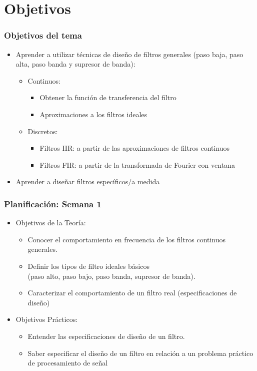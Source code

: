 \section{Objetivos}
  \begin{frame}
    \frametitle{Objetivos del tema}
      \begin{itemize}
        \item Aprender a utilizar técnicas de diseño de filtros generales (paso baja, paso alta, paso banda y supresor de banda):

        \begin{itemize}
        \normalsize
        \item Continuos: 
        \begin{itemize}
          \small
          \item Obtener la función de transferencia del filtro
          \item Aproximaciones a los filtros ideales
        \end{itemize}

        \item Discretos:
        \begin{itemize}
          \small
          \item Filtros IIR: a partir de las aproximaciones de filtros continuos
          \item Filtros FIR: a partir de la transformada de Fourier con ventana
        \end{itemize}
      \end{itemize}

      \item Aprender a diseñar filtros específicos/a medida

  \end{itemize}
\end{frame}

\begin{frame}
  \frametitle{Planificación: Semana 1}

  \begin{itemize}
    \item Objetivos de la Teoría:
    \begin{itemize}
      \item Conocer el comportamiento en frecuencia de los filtros continuos generales.
      \item Definir los tipos de filtro ideales básicos \\(paso alto, paso bajo, paso banda, supresor de banda).
      \item Caracterizar el comportamiento de un filtro real (especificaciones de diseño)
    \end{itemize}

    \item Objetivos Prácticos:
    \begin{itemize}
      \item Entender las especificaciones de diseño de un filtro.
      \item Saber especificar el diseño de un filtro en relación a un problema práctico de procesamiento de señal
    \end{itemize}
  \end{itemize}
\end{frame}

